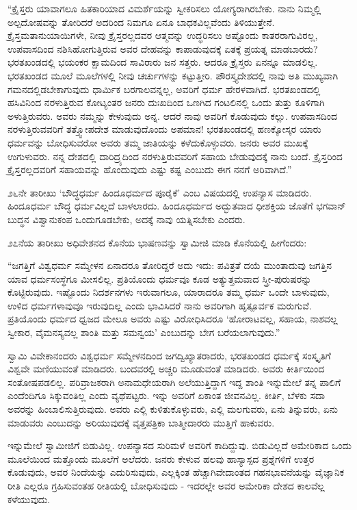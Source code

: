  “ಕ್ರೈಸ್ತರು ಯಾವಾಗಲೂ ಹಿತಕಾರಿಯಾದ ವಿಮರ್ಶೆಯನ್ನು ಸ್ವೀಕರಿಸಲು ಯೋಗ್ಯರಾಗಿರಬೇಕು. ನಾನು ನಿಮ್ಮಲ್ಲಿ ಅಲ್ಪದೋಷವನ್ನು ತೋರಿದರೆ ಅದರಿಂದ ನಿಮಗೂ ಏನೂ ಬಾಧಕವಿಲ್ಲವೆಂದು ತಿಳಿಯುತ್ತೇನೆ. ಕ್ರೈಸ್ತಮತಾನುಯಾಯಿಗಳೇ, ನೀವು ಕ್ರೈಸ್ತರಲ್ಲದವರ ಆತ್ಮವನ್ನು ಉದ್ಧರಿಸಲು ಅಷ್ಟೊಂದು ಕಾತರರಾಗುವಿರಲ್ಲ, ಉಪವಾಸದಿಂದ ನಶಿಸಿಹೋಗುತ್ತಿರುವ ಅವರ ದೇಹವನ್ನು ಕಾಪಾಡುವುದಕ್ಕೆ ಏತಕ್ಕೆ ಪ್ರಯತ್ನ ಮಾಡಬಾರದು? ಭರತಖಂಡದಲ್ಲಿ ಭಯಂಕರ ಕ್ಷಾಮದಿಂದ ಸಾವಿರಾರು ಜನ ಸತ್ತರು. ಆದರೂ ಕ್ರೈಸ್ತರು ಏನನ್ನೂ ಮಾಡಲಿಲ್ಲ. ಭರತಖಂಡದ ಮೂಲೆ ಮೂಲೆಗಳಲ್ಲಿ ನೀವು ಚರ್ಚುಗಳನ್ನು ಕಟ್ಟುತ್ತೀರಿ. ಪೌರಸ್ತ್ಯದೇಶದಲ್ಲಿ ನಾವು ಅತಿ ಮುಖ್ಯವಾಗಿ ಗಮನದಲ್ಲಿಡಬೇಕಾಗುವುದು ಧಾರ್ಮಿಕ ಬರಗಾಲವನ್ನಲ್ಲ, ಅವರಿಗೆ ಧರ್ಮ ಹೇರಳವಾಗಿದೆ. ಭರತಖಂಡದಲ್ಲಿ ಹಸಿವಿನಿಂದ ನರಳುತ್ತಿರುವ ಕೋಟ್ಯಂತರ ಜನರು ದುಃಖದಿಂದ ಒಣಗಿದ ಗಂಟಲಿನಲ್ಲಿ ಒಂದು ತುತ್ತು ಕೂಳಿಗಾಗಿ ಅಳುತ್ತಿರುವರು. ಅವರು ನಮ್ಮನ್ನು ಕೇಳುವುದು ಅನ್ನ. ಆದರೆ ನಾವು ಅವರಿಗೆ ಕೊಡುವುದು ಕಲ್ಲು. ಉಪವಾಸದಿಂದ ನರಳುತ್ತಿರುವವರಿಗೆ ತತ್ತ್ವೋಪದೇಶ ಮಾಡುವುದೊಂದು ಅಪಮಾನ! ಭರತಖಂಡದಲ್ಲಿ ಹಣಕ್ಕೋಸ್ಕರ ಯಾರು ಧರ್ಮವನ್ನು ಬೋಧಿಸುವರೋ ಅವರು ತಮ್ಮ ಜಾತಿಯನ್ನು ಕಳೆದುಕೊಳ್ಳುವರು. ಜನರು ಅವರ ಮುಖಕ್ಕೆ ಉಗುಳುವರು. ನನ್ನ ದೇಶದಲ್ಲಿ ದಾರಿದ್ರ್ಯದಿಂದ ನರಳುತ್ತಿರುವವರಿಗೆ ಸಹಾಯ ಬೇಡುವುದಕ್ಕೆ ನಾನು ಬಂದೆ. ಕ್ರೈಸ್ತರಿಂದ ಕ್ರೈಸ್ತರಲ್ಲದವರಿಗೆ ಸಹಾಯವನ್ನು ಹೊಂದುವುದು ಎಷ್ಟು ಕಷ್ಟ ಎಂಬುದು ಈಗ ನನಗೆ ಅರಿವಾಗಿದೆ.” 

 ೨೬ನೇ ತಾರೀಖು ‘ಬೌದ್ಧಧರ್ಮ ಹಿಂದೂಧರ್ಮದ ಪೂರೈಕೆ’ ಎಂಬ ವಿಷಯದಲ್ಲಿ ಉಪನ್ಯಾಸ ಮಾಡಿದರು. ಹಿಂದೂಧರ್ಮ ಬೌದ್ಧ ಧರ್ಮವಿಲ್ಲದೆ ಬಾಳಲಾರದು. ಹಿಂದೂಧರ್ಮದ ಅದ್ಭುತವಾದ ಧೀಶಕ್ತಿಯ ಜೊತೆಗೆ ಭಗವಾನ್ ಬುದ್ಧನ ವಿಶ್ವಾನುಕಂಪ ಒಂದುಗೂಡಬೇಕು, ಅದಕ್ಕೆ ನಾವು ಯತ್ನಿಸಬೇಕು ಎಂದರು. 

 ೨೭ನೆಯ ತಾರೀಖು ಅಧಿವೇಶನದ ಕೊನೆಯ ಭಾಷಣವನ್ನು ಸ್ವಾಮೀಜಿ ಮಾಡಿ ಕೊನೆಯಲ್ಲಿ ಹೀಗೆಂದರು: 

 “ಜಗತ್ತಿಗೆ ವಿಶ್ವಧರ್ಮ ಸಮ್ಮೇಳನ ಏನಾದರೂ ತೋರಿದ್ದರೆ ಅದು ಇದು: ಪವಿತ್ರತೆ ದಯೆ ಮುಂತಾದುವು ಜಗತ್ತಿನ ಯಾವ ಧರ್ಮಸಂಸ್ಥೆಗೂ ಮೀಸಲಿಲ್ಲ. ಪ್ರತಿಯೊಂದು ಧರ್ಮವೂ ಕೂಡ ಅತ್ಯುತ್ತಮವಾದ ಸ್ತ್ರೀ-ಪುರುಷರನ್ನು ಕೊಟ್ಟಿರುವುದು. ಇಷ್ಟೊಂದು ನಿದರ್ಶನಗಳು ಇರುವಾಗಲೂ, ಯಾರಾದರೂ ತಮ್ಮ ಧರ್ಮ ಒಂದೇ ಬಾಳುವುದು, ಉಳಿದ ಧರ್ಮಗಳಾವುವೂ ಇರುವುದಿಲ್ಲ ಎಂದು ಭಾವಿಸಿದರೆ ನಾನು ಅವರಿಗಾಗಿ ಹೃತ್ಪೂರ್ವಕ ಮರುಗುವೆ. ಪ್ರತಿಯೊಂದು ಧರ್ಮದ ಧ್ವಜದ ಮೇಲೂ ಅವರು ಎಷ್ಟು ವಿರೋಧಿಸಿದರೂ ‘ಹೋರಾಟವಲ್ಲ, ಸಹಾಯ, ನಾಶವಲ್ಲ ಸ್ವೀಕಾರ, ವೈಮನಸ್ಯವಲ್ಲ ಶಾಂತಿ ಮತ್ತು ಸಮನ್ವಯ’ ಎಂಬುದನ್ನು ಬೇಗ ಬರೆಯಲಾಗುವುದು.” 

 ಸ್ವಾಮಿ ವಿವೇಕಾನಂದರು ವಿಶ್ವಧರ್ಮ ಸಮ್ಮೇಳನದಿಂದ ಜಗದ್ವಿಖ್ಯಾತರಾದರು, ಭರತಖಂಡದ ಧರ್ಮಕ್ಕೆ ಸಂಸ್ಕೃತಿಗೆ ವಿಶ್ವವೇ ಮಣಿಯುವಂತೆ ಮಾಡಿದರು. ಬಂದವರಲ್ಲಿ ಅಚ್ಚರಿ ಮೂಡುವಂತೆ ಮಾಡಿದರು. ಅವರು ಕೀರ್ತಿಯಿಂದ ಸಂತೋಷಪಡಲಿಲ್ಲ. ಪರಿವ್ರಾಜಕರಾಗಿ ಅನಾಮಧೇಯರಾಗಿ ಅಲೆಯುತ್ತಿದ್ದಾಗ ಇದ್ದ ಶಾಂತಿ ಇನ್ನುಮೇಲೆ ತನ್ನ ಪಾಲಿಗೆ ಎಂದೆಂದಿಗೂ ಸಿಕ್ಕುವಂತಿಲ್ಲ ಎಂದು ವ್ಯಥೆಪಟ್ಟರು. ಇನ್ನು ಅವರಿಗೆ ಏಕಾಂತ ಜೀವನವಿಲ್ಲ. ಕೀರ್ತಿ, ಬೆಳಕು ಸದಾ ಅವರನ್ನು ಹಿಂಬಾಲಿಸುತ್ತಿರುವುದು. ಅವರು ಎಲ್ಲಿ ಕುಳಿತುಕೊಳ್ಳುವರು, ಎಲ್ಲಿ ಮಲಗುವರು, ಏನು ತಿನ್ನುವರು, ಏನು ಮಾಡುವರು ಎಂಬುದನ್ನು ಅರಿಯುವುದಕ್ಕೆ ವೃತ್ತಪತ್ರಿಕಾ ಬಾತ್ಮೀದಾರರು ಮುತ್ತಿಗೆ ಹಾಕುವರು. 

 ಇನ್ನುಮೇಲೆ ಸ್ವಾಮೀಜಿಗೆ ಬಿಡುವಿಲ್ಲ. ಉಪನ್ಯಾಸದ ಸುರಿಮಳೆ ಅವರಿಗೆ ಕಾದಿದ್ದುವು. ಬಿಡುವಿಲ್ಲದೆ ಅಮೇರಿಕಾದ ಒಂದು ಮೂಲೆಯಿಂದ ಮತ್ತೊಂದು ಮೂಲೆಗೆ ಅಲೆದರು. ಜನರು ಕೇಳುವ ಹಲವು ಹಾಸ್ಯಾಸ್ಪದ ಪ್ರಶ್ನೆಗಳಿಗೆ ಉತ್ತರ ಕೊಡುವುದು, ಅವರ ನಿಂದೆಯನ್ನು ಎದುರಿಸುವುದು, ಎಲ್ಲಕ್ಕಿಂತ ಹೆಚ್ಚಾಗಿ\break ವೇದಾಂತದ ಗಹನಭಾವನೆಯನ್ನು ವೈಜ್ಞಾನಿಕ ರೀತಿ ಎಲ್ಲರೂ ಗ್ರಹಿಸುವಂತಹ ರೀತಿಯಲ್ಲಿ ಬೋಧಿಸುವುದು - ಇದರಲ್ಲೇ ಅವರ ಅಮೇರಿಕಾ ದೇಶದ ಕಾಲವೆಲ್ಲ ಕಳೆಯುವುದು. 

